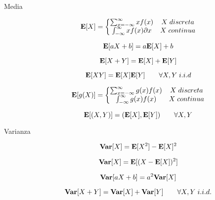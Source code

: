 \begin{description}
	\item [Media]
		\begin{equation}
		\mathbf{E}[X] = \left\{\begin{matrix}
		\sum_{x=-\infty}^{\infty} xf(x) & X \; discreta \\
		\int_{-\infty}^{\infty} x f(x) \partial x & X \; continua
		\end{matrix}\right.
		\end{equation}
	
		\begin{equation}
		\mathbf{E}[aX+b] = a \mathbf{E}[X] + b
		\end{equation}
		
		\begin{equation}
		\mathbf{E}[X+Y] = \mathbf{E}[X] + \mathbf{E}[Y]
		\end{equation}
		
		\begin{equation}
		\mathbf{E}[XY] = \mathbf{E}[X] \mathbf{E}[Y] \qquad\forall X,Y \; i.i.d
		\end{equation}
		
		\begin{equation}
		\mathbf{E}[g(X)] = \left\{\begin{matrix}
		\sum_{x=-\infty}^{\infty} g(x) f(x) & X \; discreta \\
		\int_{-\infty}^{\infty} g(x) f(x) & X \; continua
		\end{matrix}\right.
		\end{equation}
		
		\begin{equation}
		\mathbf{E}[(X,Y)] = (\mathbf{E}[X],\mathbf{E}[Y]) \qquad\forall X,Y
		\end{equation}
		
	\item [Varianza]
		\begin{equation}
		\mathbf{Var}[X] = \mathbf{E}[X^{2}]-\mathbf{E}[X]^{2}
		\end{equation}

		\begin{equation}
		\mathbf{Var}[X] = \mathbf{E}[(X-\mathbf{E}[X])^{2}]
		\end{equation}
		
		\begin{equation}
		\mathbf{Var}[aX+b] = a^{2}\mathbf{Var}[X]
		\end{equation}
		
		\begin{equation}
		\mathbf{Var}[X+Y] = \mathbf{Var}[X]+\mathbf{Var}[Y] \qquad\forall X,Y \; i.i.d.
		\end{equation}
		

\end{description}
